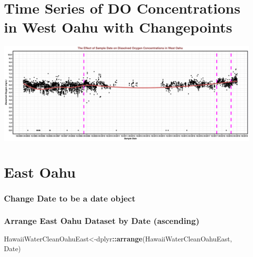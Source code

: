\documentclass[12pt,]{article}
\newenvironment{Shaded}{\begin{snugshade}}{\end{snugshade}}
\newcommand{\KeywordTok}[1]{\textcolor[rgb]{0.13,0.29,0.53}{\textbf{#1}}}
\newcommand{\DataTypeTok}[1]{\textcolor[rgb]{0.13,0.29,0.53}{#1}}
\newcommand{\StringTok}[1]{\textcolor[rgb]{0.31,0.60,0.02}{#1}}
\newcommand{\OperatorTok}[1]{\textcolor[rgb]{0.81,0.36,0.00}{\textbf{#1}}}
\newcommand{\NormalTok}[1]{#1}
\begin{document}
\section{Time Series of DO Concentrations in West Oahu with
Changepoints}\label{time-series-of-do-concentrations-in-west-oahu-with-changepoints}

\includegraphics{Garcia_ENV872_Project_files/figure-latex/West Oahu-1.pdf}

\section{East Oahu}\label{east-oahu}

\subsubsection{Change Date to be a date
object}\label{change-date-to-be-a-date-object-3}

\begin{Shaded}
\end{Shaded}

\subsubsection{Arrange East Oahu Dataset by Date
(ascending)}\label{arrange-east-oahu-dataset-by-date-ascending}

\begin{Shaded}
\begin{Highlighting}[]
\NormalTok{HawaiiWaterCleanOahuEast<-dplyr}\OperatorTok{::}\KeywordTok{arrange}\NormalTok{(HawaiiWaterCleanOahuEast, Date)}
\end{Highlighting}
\end{Shaded}
\end{document}
